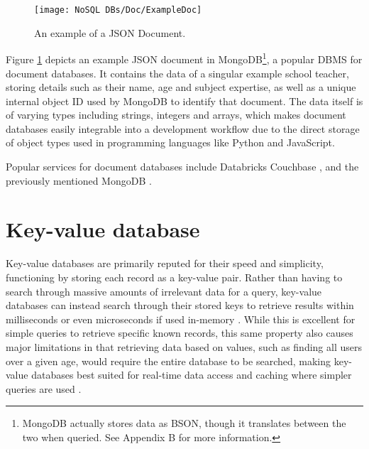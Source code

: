 
\begin{figure}[H]
    \centering
    \texttt{[image: NoSQL DBs/Doc/ExampleDoc]}
    \caption{An example of a JSON Document.\label{fig:ExampleDoc}}
\end{figure}

\noindent Figure \ref{fig:ExampleDoc} depicts an example JSON document in MongoDB\footnote{MongoDB actually stores data as BSON, though it translates between the two when queried. See Appendix B for more information.}, a popular DBMS
for document databases. It contains the data of a singular example school teacher, storing details such as their name, age and subject expertise, as well as a unique internal object ID used by MongoDB to identify that document. The data itself is of varying types including 
strings, integers and arrays, which makes document databases easily integrable into a development workflow due to the direct 
storage of object types used in programming languages like Python and JavaScript.


\para Popular services for document databases include Databricks \autocite{databricksDataAICompany2023} Couchbase \autocite{couchbaseCouchbaseBestFree}, and the previously mentioned MongoDB \autocite{mongodbDocumentDatabaseNoSQL}.


\section{Key-value database}
Key-value databases are primarily reputed for their speed and simplicity, functioning by storing each record as a key-value pair.
Rather than having to search through massive amounts of irrelevant data for a query, key-value databases can instead search 
through their stored keys to retrieve results within milliseconds or even microseconds if used in-memory \autocite{redisRedisFAQ}.
While this is excellent for simple queries to retrieve specific known records, this same property also causes major limitations in
that retrieving data based on values, such as finding all users over a given age, would require the entire database to be searched,
making key-value databases best suited for real-time data access and caching where simpler queries are used \autocite{mongodbWhatKeyValueDatabase}.

